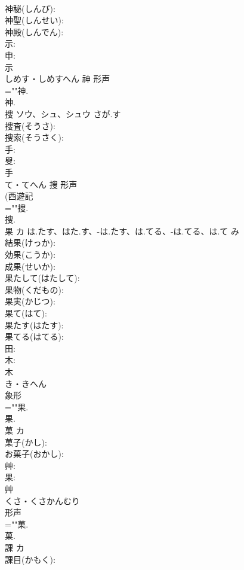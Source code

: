 \documentclass[8pt]{extreport}
\begin{document}
\begin{CJK}{UTF8}{min}
\\	神秘(しんぴ): 
\\	神聖(しんせい): 
\\	神殿(しんでん): 
\\	示: 
\\	申: 
\\	示	
\\	しめす・しめすへん	神	形声 
\\	=""神.
\\	神.
\\	捜	ソウ、シュ、シュウ	さが.す		
\\	捜査(そうさ): 
\\	捜索(そうさく): 
\\	手: 
\\	叟: 
\\	手	
\\	て・てへん	搜	形声 
\\	(西遊記 
\\	=""捜.
\\	捜.
\\	果	カ	は.たす、はた.す、-は.たす、は.てる、-は.てる、は.て	み	
\\	結果(けっか): 
\\	効果(こうか): 
\\	成果(せいか): 
\\	果たして(はたして): 
\\	果物(くだもの): 
\\	果実(かじつ): 
\\	果て(はて): 
\\	果たす(はたす): 
\\	果てる(はてる): 
\\	田: 
\\	木: 
\\	木	
\\	き・きへん	
\\	象形 
\\	=""果.
\\	果.
\\	菓	カ			
\\	菓子(かし): 
\\	お菓子(おかし): 
\\	艸: 
\\	果: 
\\	艸	
\\	くさ・くさかんむり	
\\	形声 
\\	=""菓.
\\	菓.
\\	課	カ			
\\	課目(かもく): 

\end{CJK}
\end{document}
